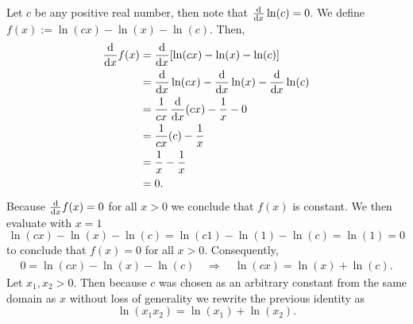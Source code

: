 \documentclass[12 pt,letterpaper]{article}
\begin{document}
Let \(c\) be any positive real number, then note that \(\dv{x} \ln(c) = 0\).
We define \(f(x):= \ln(cx) - \ln(x) - \ln(c)\). Then,
\begin{align*}
    \dv{x} f(x)
    &= \dv{x}[\ln(cx) - \ln(x) - \ln(c)] \\
    &= \dv{x}\ln(cx) - \dv{x}\ln(x) - \dv{x}\ln(c) \\
    &= \frac{1}{cx}\,\dv{x}(cx) - \frac{1}{x} - 0 \\
    &= \frac{1}{cx}(c) - \frac{1}{x} \\
    &= \frac{1}{x} - \frac{1}{x} \\
    &= 0.
\end{align*}
Because \(\dv{x}f(x)=0\) for all \(x>0\) we conclude that \(f(x)\) is constant.
We then evaluate with \(x=1\)
\[ \ln(cx) - \ln(x) - \ln(c) = \ln(c1) - \ln(1) - \ln(c) = \ln(1) = 0 \]
to conclude that \(f(x)=0\) for all \(x>0\). Consequently,
\begin{align*}
    0 = \ln(cx) - \ln(x) - \ln(c)
    \quad \Rightarrow \quad
    \ln(cx) = \ln(x) + \ln(c).
\end{align*}
Let \(x_1,x_2>0\).
Then because \(c\) was chosen as an arbitrary constant from the 
same domain as \(x\) without loss of generality we rewrite the previous identity as
\[ \ln(x_1x_2) = \ln(x_1) + \ln(x_2). \]

\clearpage
\end{document}
